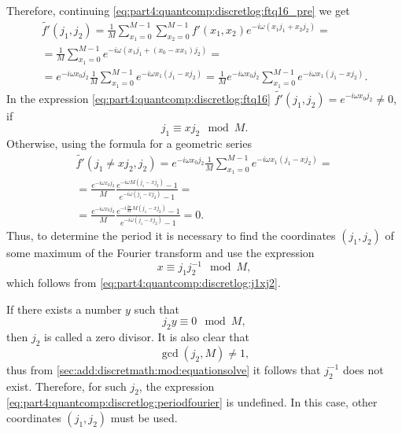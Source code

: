 Therefore, continuing \eqref{eq:part4:quantcomp:discretlog:ftq16_pre} we get
\begin{eqnarray}
\tilde{f'}\left(j_1, j_2\right) = 
\frac{1}{M}\sum_{x_1 = 0}^{M-1}\sum_{x_2 = 0}^{M-1} 
f'\left(x_1, x_2\right)e^{-i \omega\left(x_1 j_1 + x_2j_2\right)} =
\nonumber \\
=
 \frac{1}{M}\sum_{x_1 = 0}^{M-1}
e^{-i \omega\left(x_1 j_1 + (x_0 - x
   x_1) j_2\right)} = 
\nonumber \\
= e^{-i \omega x_0 j_2}\frac{1}{M}\sum_{x_1 = 0}^{M-1}
e^{-i  \omega x_1 \left(j_1 - x j_2\right)} =
\frac{1}{M} e^{-i \omega x_0 j_2} 
\sum_{x_1 = 0}^{M-1} e^{-i  \omega x_1 \left(j_1 - x j_2\right)}.
\label{eq:part4:quantcomp:discretlog:ftq16}
\end{eqnarray}
In the expression
\eqref{eq:part4:quantcomp:discretlog:ftq16} $\tilde{f'}(j_1, j_2) =
e^{-i \omega x_0 j_2} \ne 0$, if 
\begin{equation}
j_1 \equiv x j_2 \mod M.
\label{eq:part4:quantcomp:discretlog:j1xj2}
\end{equation} 
Otherwise, using the formula for a geometric series 
\begin{eqnarray}
\tilde{f'}\left(j_1 \ne x j_2, j_2\right) = 
e^{-i \omega x_0 j_2}\frac{1}{M}
\sum_{x_1 = 0}^{M-1}e^{-i
  \omega x_1 \left(j_1 - x j_2\right)} = 
\nonumber \\
=
\frac{e^{-i \omega x_0 j_2}}{M} \frac{e^{-i
  \omega M \left(j_1 - x j_2\right)} - 1}{e^{-i
  \omega \left(j_1 - x j_2\right)} - 1} = 
\nonumber \\
=
 \frac{e^{-i \omega x_0 j_2}}{M} 
\frac{e^{-i \frac{2 \pi}{M} M \left(j_1 - x j_2\right)} - 1}{e^{-i
  \omega \left(j_1 - x j_2\right)} - 1} = 0.
\nonumber
\end{eqnarray} 
Thus, to determine the period it is necessary to find the coordinates $(j_1, j_2)$
of some maximum of the Fourier transform and use the expression 
\begin{equation}
x \equiv j_1 j_2^{-1} \mod M,
\label{eq:part4:quantcomp:discretlog:periodfourier}
\end{equation}
which follows from \eqref{eq:part4:quantcomp:discretlog:j1xj2}.

\begin{remark}
If there exists a number $y$ such that 
\[
j_2 y \equiv 0 \mod M,
\]
then $j_2$ is called a zero divisor. 
It is also clear that 
\[
\gcd\left(j_2, M\right) \ne 1,
\]
thus from \autoref{sec:add:discretmath:mod:equationsolve}
it follows that $j_2^{-1}$ does not exist. Therefore, for such
$j_2$, the expression
\eqref{eq:part4:quantcomp:discretlog:periodfourier} is undefined. In
this case, other coordinates $(j_1, j_2)$ must be used. 
\end{remark}

